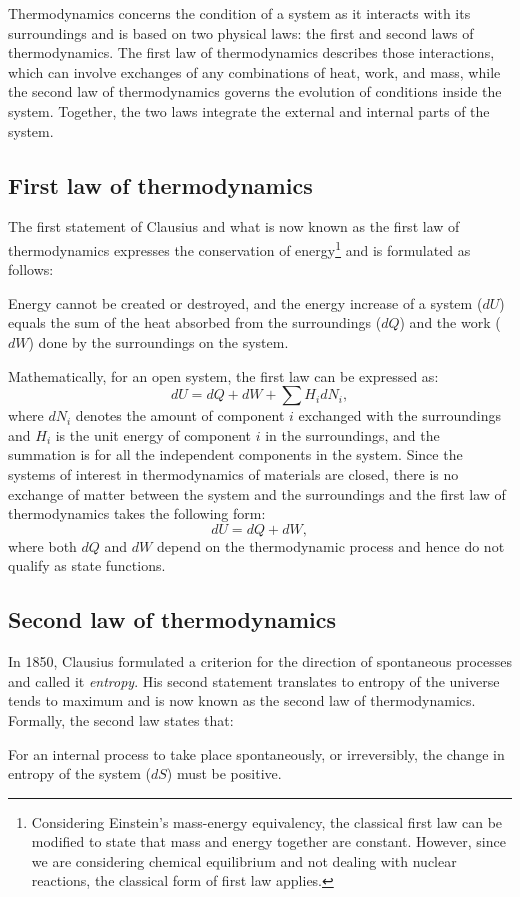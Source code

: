     Thermodynamics concerns the condition of a system as it interacts with its surroundings and is based on two physical laws: the first and second laws of thermodynamics. The first law of thermodynamics describes those interactions, which can involve exchanges of any combinations of heat, work, and mass, while the second law of thermodynamics governs the evolution of conditions inside the system. Together, the two laws integrate the external and internal parts of the system.

\subsection{First law of thermodynamics}
    The first statement of Clausius and what is now known as the first law of thermodynamics expresses the conservation of energy\footnote{Considering Einstein's mass-energy equivalency, the classical first law can be modified to state that mass and energy together are constant. However, since we are considering chemical equilibrium and not dealing with nuclear reactions, the classical form of first law applies.} and is formulated as follows:
    \begin{displayquote}
        Energy cannot be created or destroyed, and the energy increase of a system ($dU$) equals the sum of the heat absorbed from the surroundings ($dQ$) and the work ($dW$) done by the surroundings on the system.
    \end{displayquote}

Mathematically, for an open system, the first law can be expressed as:
\begin{equation}\label{eqn:flot}
    dU = dQ + dW + \sum H_i dN_i,
\end{equation}
where $dN_i$ denotes the amount of component $i$ exchanged with the surroundings and $H_i$ is the unit energy of component $i$ in the surroundings, and the summation is for all the independent components in the system. Since the systems of interest in thermodynamics of materials are closed, there is no exchange of matter between the system and the surroundings and the first law of thermodynamics takes the following form:
\begin{equation}\label{eqn:flot1}
    dU = dQ + dW,
\end{equation}
where both $dQ$ and $dW$ depend on the thermodynamic process and hence do not qualify as state functions.

\subsection{Second law of thermodynamics}
In 1850, Clausius formulated a criterion for the direction of spontaneous processes and called it \emph{entropy}. His second statement translates to entropy of the universe tends to maximum and is now known as the second law of thermodynamics. Formally, the second law states that:
\begin{displayquote}
    For an internal process to take place spontaneously, or irreversibly, the change in entropy of the system ($dS$) must be positive.
\end{displayquote}

